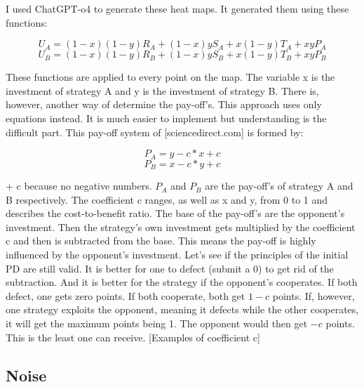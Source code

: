 \documentclass{article}
\begin{document}
I used ChatGPT-o4 to generate these heat maps.
It generated them using these functions:

$$U_A = (1-x)(1-y)R_A + (1-x)yS_A + x(1-y)T_A + xyP_A$$
$$U_B = (1-x)(1-y)R_B + (1-x)yS_B + x(1-y)T_B + xyP_B$$

These functions are applied to every point on the map.
The variable x is the investment of strategy A and y is the investment of strategy B.
There is, however, another way of determine the pay-off's.
This approach uses only equations instead.
It is much easier to implement but understanding is the difficult part.
This pay-off system of [sciencedirect.com] is formed by:

$$P_A = y - c*x + c$$
$$P_B = x - c*y + c$$

+ c because no negative numbers.
$P_A$ and $P_B$ are the pay-off's of strategy A and B respectively.
The coefficient c ranges, as well as x and y, from 0 to 1 and describes the cost-to-benefit ratio.
The base of the pay-off's are the opponent's investment.
Then the strategy's own investment gets multiplied by the coefficient c and then is subtracted from the base.
This means the pay-off is highly influenced by the opponent's investment.
Let's see if the principles of the initial PD are still valid.
It is better for one to defect (submit a 0) to get rid of the subtraction.
And it is better for the strategy if the opponent's cooperates.
If both defect, one gets zero points.
If both cooperate, both get $1 - c$ points.
If, however, one strategy exploits the opponent, meaning it defects while the other cooperates, it will get the maximum points being 1.
The opponent would then get $-c$ points.
This is the least one can receive.
[Examples of coefficient c]
\\


\subsection{Noise}
\end{document}
